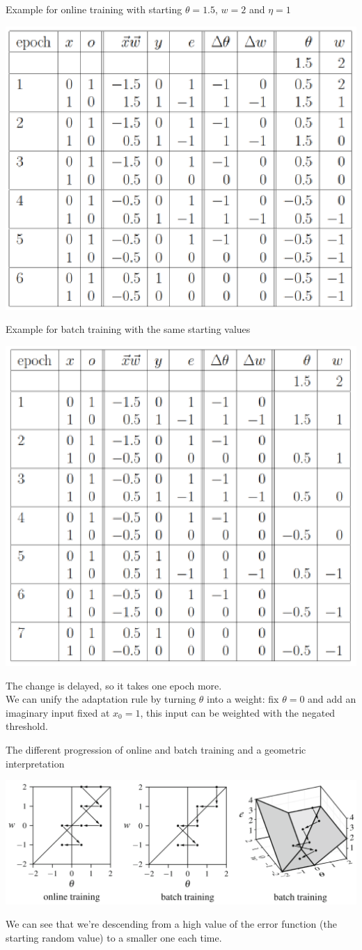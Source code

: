 \newpage

Example for online training with starting $\theta = 1.5$, $w = 2$ and $\eta = 1$
\begin{center}
	\includegraphics[width=0.6\columnwidth]{img/NN/delta1}
\end{center}

Example for batch training with the same starting values
\begin{center}
	\includegraphics[width=0.6\columnwidth]{img/NN/delta2}
\end{center}
The change is delayed, so it takes one epoch more.\\

We can unify the adaptation rule by turning $\theta$ into a weight: fix $\theta = 0$ and add an imaginary input fixed at $x_0 = 1$, this input can be weighted with the negated threshold.\\

\newpage

The different progression of online and batch training and a geometric interpretation
\begin{center}
	\includegraphics[width=0.9\columnwidth]{img/NN/delta3}
\end{center}
We can see that we're descending from a high value of the error function (the starting random value) to a smaller one each time.\\

